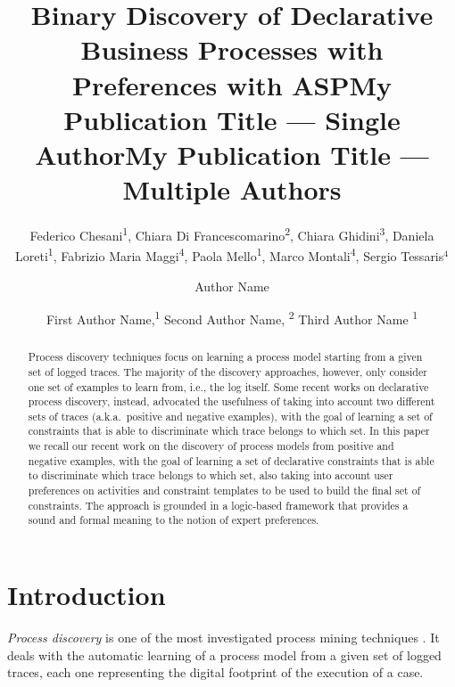\documentclass[letterpaper]{article} %
\title{Binary Discovery of Declarative Business Processes with Preferences with ASP}
\author{
	Federico Chesani\textsuperscript{\rm 1}, 
	Chiara Di Francescomarino\textsuperscript{\rm 2}, 
	Chiara Ghidini\textsuperscript{\rm 3}, 
	Daniela Loreti\textsuperscript{\rm 1}, 
	Fabrizio Maria Maggi\textsuperscript{\rm 4}, 
	Paola Mello\textsuperscript{\rm 1}, 
	Marco Montali\textsuperscript{\rm 4}, Sergio Tessaris$^4$\\
}
\title{My Publication Title --- Single Author}
\author {
    Author Name
}
\title{My Publication Title --- Multiple Authors}
\author {
    First Author Name,\textsuperscript{\rm 1}
    Second Author Name, \textsuperscript{\rm 2}
    Third Author Name \textsuperscript{\rm 1}
}
\theoremstyle{definition}
\begin{document}
\maketitle

\begin{abstract}
Process discovery techniques focus on learning a process model starting from a given set of logged traces. The majority of the discovery approaches, however, only consider one set of examples to learn from, i.e., the log itself. Some recent works on declarative process discovery, instead, advocated the usefulness of taking into account two different sets of traces (a.k.a.\ positive and negative examples), with the goal of learning a set of constraints that is able to discriminate which trace belongs to which set.
In this paper we recall our recent work on the discovery of process models from positive and negative examples, with the goal of learning a set of declarative constraints that is able to discriminate which trace belongs to which set, also taking into account user preferences on  activities and constraint templates to be used to build the final set of constraints. The approach is grounded in a logic-based framework that provides a sound and formal meaning to the notion of expert preferences. 
\end{abstract}

\section{Introduction}

\emph{Process discovery} is one of the most investigated process mining techniques \cite{2012-Aalst}. It deals with the automatic learning of a process model from a given set of logged traces, each one representing the digital footprint of the execution of a case.
\end{document}
